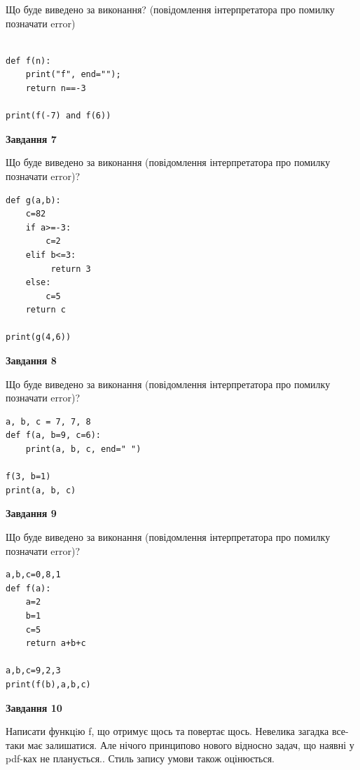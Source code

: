 \documentclass[12pt, ukrainian]{article}
\begin{document}
{\begin {large}
Що буде виведено за виконання? (повідомлення інтерпретатора про помилку позначати error)\par
\begin{verbatim}

def f(n):
    print("f", end="");
    return n==-3

print(f(-7) and f(6))
\end{verbatim}

{\begin {center}\textbf{Завдання 7}\end {center}}

Що буде виведено за виконання (повідомлення інтерпретатора про помилку позначати error)?\par
\begin{verbatim}
def g(a,b):
    c=82
    if a>=-3:
        c=2
    elif b<=3:
         return 3
    else: 
        c=5
    return c

print(g(4,6))
\end{verbatim}

{\begin {center}\textbf{Завдання 8}\end {center}}

Що буде виведено за виконання (повідомлення інтерпретатора про помилку позначати error)?\par
\begin{verbatim}
a, b, c = 7, 7, 8
def f(a, b=9, c=6):
    print(a, b, c, end=" ")

f(3, b=1)
print(a, b, c)
\end{verbatim}

{\begin {center}\textbf{Завдання 9}\end {center}}

Що буде виведено за виконання (повідомлення інтерпретатора про помилку позначати error)?\par
\begin{verbatim}
a,b,c=0,8,1
def f(a):
    a=2
    b=1
    c=5
    return a+b+c

a,b,c=9,2,3
print(f(b),a,b,c)
\end{verbatim}

{\begin {center}\textbf{Завдання 10}\end {center}}


Написати функцiю f, що отримує щось та повертає щось. Невелика загадка все-таки має залишатися. Але нічого принципово нового відносно задач, що наявні у pdf-ках не планується.. Стиль запису умови також оцінюється.\par
\end {large}}
\newpage
\end{document}
